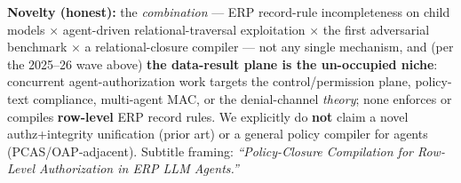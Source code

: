\documentclass[11pt,a4paper]{article}
\begin{document}
\textbf{Novelty (honest):} the \emph{combination} --- ERP record-rule incompleteness on child models $\times$
agent-driven relational-traversal exploitation $\times$ the first adversarial benchmark $\times$ a
relational-closure compiler --- not any single mechanism, and (per the 2025--26 wave above) \textbf{the
data-result plane is the un-occupied niche}: concurrent agent-authorization work targets the
control/permission plane, policy-text compliance, multi-agent MAC, or the denial-channel \emph{theory}; none
enforces or compiles \textbf{row-level} ERP record rules. We explicitly do \textbf{not} claim a novel
authz+integrity unification (prior art) or a general policy compiler for agents (PCAS/OAP-adjacent). Subtitle
framing: \emph{``Policy-Closure Compilation for Row-Level Authorization in ERP LLM Agents.''}

\end{document}
